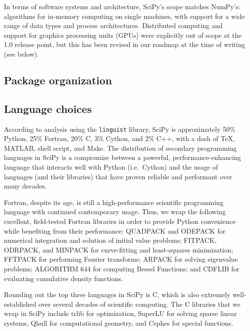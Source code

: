 \documentclass[fleqn,10pt]{wlscirep}
\begin{document}
In terms of software systems and architecture, SciPy's scope matches NumPy's:
algorithms for in-memory computing on single machines, with support for a wide
range of data types and process architectures. Distributed computing and support
for graphics processing units (GPUs) were explicitly out of scope at the 1.0
release point, but this has been revised in our roadmap at the time of writing
(see below).

\subsection*{Package organization}


\subsection*{Language choices}

According to analysis using the \texttt{linguist} library\cite{linguistref}, SciPy is approximately 50\% Python, 25\% Fortran, 20\% C, 3\% Cython, and 2\% C++, with a dash of \TeX, MATLAB, shell script, and Make. The distribution of secondary programming languages in SciPy is a compromise between a powerful, performance-enhancing language that interacts well with Python (i.e.\ Cython) and the usage of languages (and their libraries) that have proven reliable and performant over many decades.

Fortran, despite its age, is still a high-performance scientific programming language with
continued contemporary usage\cite{Koelbel:1993:HPF:562354}. Thus, we wrap the following excellent, field-tested Fortran
libraries in order to provide Python convenience while benefiting from their performance:
QUADPACK\cite{piessens1983quadpack} and ODEPACK\cite{hindmarsh1983odepack} for numerical integration
and solution of initial value problems;
FITPACK\cite{Dierckx:1993:CSF:151103}, ODRPACK\cite{ODRPACK_Boggs}, and MINPACK\cite{osti_6997568} for
curve-fitting and least-squares minimization;
FFTPACK\cite{SWARZTRAUBER198445, SWARZTRAUBER198251} for performing Fourier transforms;
ARPACK\cite{leh:sor:yan96} for solving eigenvalue problems;
ALGORITHM 644\cite{Amos:1986:APP:7921.214331} for computing Bessel Functions; and
CDFLIB\cite{CDFLIB_site} for evaluating cumulative density functions.

Rounding out the top three languages in SciPy is C, which is also extremely
well-established over several decades\cite{Kernighan:1988:CPL:576122} of
scientific computing. The C libraries that we wrap in SciPy include
trlib\cite{doi:10.1080/10556788.2018.1449842} for optimization, %
SuperLU\cite{li05,superlu_ug99} for solving sparse linear systems, %
Qhull\cite{Barber:1996:QAC:235815.235821} for computational geometry, and %
Cephes\cite{cephes_netlib} for special functions. %
\end{document}
